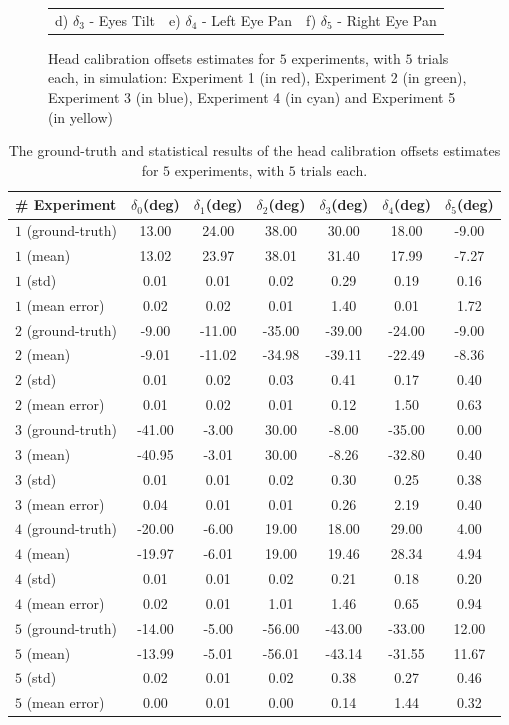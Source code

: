 \begin{figure}
\begin{tabular}{ccc}
 d) $\delta_3$ - Eyes Tilt & e) $\delta_4$ - Left Eye Pan & f) $\delta_5$ - Right Eye Pan
\end{tabular}
\caption{Head calibration offsets estimates for $5$ experiments, with $5$ trials each, in simulation: Experiment 1 (in red), Experiment 2 (in green), Experiment 3 (in blue), Experiment 4 (in cyan) and Experiment 5 (in yellow)}
\label{fig:head_offsets_convergence}
\end{figure}

\begin{table}
\centering
\begin{tabular}{lcccccc}
 \hline
 \# Experiment & $\delta_0$(deg) & $\delta_1$(deg) & $\delta_2$(deg) & $\delta_3$(deg) & $\delta_4$(deg) & $\delta_5$(deg) \\
 \hline
$1$ (ground-truth) & 13.00 & 24.00 & 38.00 & 30.00 & 18.00 & -9.00\\
$1$ (mean) & 13.02 & 23.97 & 38.01 & 31.40 & 17.99 & -7.27\\
$1$ (std) & 0.01 & 0.01 & 0.02 & 0.29 & 0.19 & 0.16 \\
$1$ (mean error) & 0.02 & 0.02 & 0.01 & 1.40 & 0.01 & 1.72\\
 \hline
$2$ (ground-truth) & -9.00 & -11.00 & -35.00 & -39.00 & -24.00 & -9.00\\
$2$ (mean) & -9.01 & -11.02 & -34.98 & -39.11 & -22.49 & -8.36\\
$2$ (std) & 0.01 & 0.02 & 0.03 & 0.41 & 0.17 & 0.40 \\
$2$ (mean error) & 0.01 & 0.02 & 0.01 & 0.12 & 1.50 & 0.63\\
 \hline
$3$ (ground-truth) & -41.00 & -3.00 & 30.00 & -8.00 & -35.00 & 0.00\\
$3$ (mean) & -40.95 & -3.01 & 30.00 & -8.26 & -32.80 & 0.40\\
$3$ (std) & 0.01 & 0.01 & 0.02 & 0.30 & 0.25 & 0.38 \\
$3$ (mean error) & 0.04 & 0.01 & 0.01 & 0.26 & 2.19 & 0.40\\
 \hline
$4$ (ground-truth) & -20.00 & -6.00 & 19.00 & 18.00 & 29.00 & 4.00\\
$4$ (mean) & -19.97 & -6.01 & 19.00 & 19.46 & 28.34 & 4.94\\
$4$ (std) & 0.01 & 0.01 & 0.02 & 0.21 & 0.18 & 0.20 \\
$4$ (mean error) & 0.02 & 0.01 & 1.01 & 1.46 & 0.65 & 0.94\\
 \hline
$5$ (ground-truth) & -14.00 & -5.00 & -56.00 & -43.00 & -33.00 & 12.00\\
$5$ (mean) & -13.99 & -5.01 & -56.01 & -43.14 & -31.55 & 11.67\\
$5$ (std) & 0.02 & 0.01 & 0.02 & 0.38 & 0.27 & 0.46\\
$5$ (mean error) & 0.00 & 0.01 & 0.00 & 0.14 & 1.44 & 0.32\\
 \hline
\end{tabular}
\caption{The ground-truth and statistical results of the head calibration offsets estimates for $5$ experiments, with $5$ trials each.}
\label{tab:head_offsets_convergence}
\end{table}

